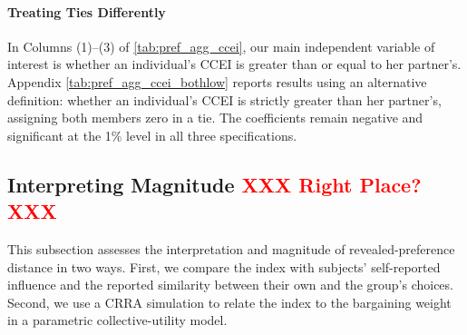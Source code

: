 \documentclass[11 pt]{article}
\begin{document}


\paragraph{Treating Ties Differently} In Columns (1)--(3) of \autoref{tab:pref_agg_ccei}, our main independent variable of interest is whether an individual's CCEI is greater than or equal to her partner's. Appendix \autoref{tab:pref_agg_ccei_bothlow} reports results using an alternative definition: whether an individual's CCEI is strictly greater than her partner's, assigning both members zero in a tie. The coefficients remain negative and significant at the 1\% level in all three specifications.

\subsection{Interpreting Magnitude \textcolor{red}{XXX Right Place? XXX}}\label{subsec:magnitude} This subsection assesses the interpretation and magnitude of revealed-preference distance in two ways. First, we compare the index with subjects' self-reported influence and the reported similarity between their own and the group's choices. Second, we use a CRRA simulation to relate the index to the bargaining weight in a parametric collective-utility model.
\end{document}
